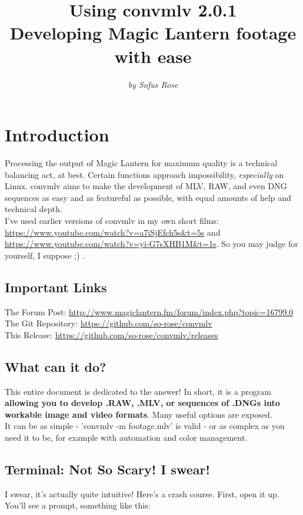 \documentclass[a4paper,12pt]{article}
\author{\textit{by Sofus Rose}}
\title{\textbf{Using convmlv 2.0.1} \\ {\large Developing Magic Lantern footage with ease}}
\begin{document}
\maketitle{}
\tableofcontents{}
\newpage

\section{Introduction}
	Processing the output of Magic Lantern for maximum quality is a technical balancing act, at best. Certain functions approach impossibility,
	\textit{especially} on Linux. convmlv aims to make the development of MLV, RAW, and even DNG sequences as easy and as featureful as
	possible, with equal amounts of help and technical depth.\\
	
	I've used earlier versions of convmlv in my own short films: \url{https://www.youtube.com/watch?v=a7iSjEfch5s&t=5s} and \url{https://www.youtube.com/watch?v=yi-G7sXHB1M&t=1s}.
	So you may judge for yourself, I suppose ;) .
	
	\subsection{Important Links}
		The Forum Post: \url{http://www.magiclantern.fm/forum/index.php?topic=16799.0}\\
		The Git Repository: \url{https://github.com/so-rose/convmlv}\\
		This Release: \url{https://github.com/so-rose/convmlv/releases}\\
	
	\subsection{What can it do?}
		This entire document is dedicated to the answer! In short, it is a program \textbf{allowing you to develop .RAW, .MLV, or sequences of .DNGs
		into workable image and video formats}. Many useful options are exposed.\\
		
		It can be as simple - 'convmlv -m footage.mlv' is valid - or as complex as you need it to be, for example with automation and color management.

	\subsection{Terminal: Not So Scary! I swear!}
		I swear, it's actually quite intuitive! Here's a crash course. First, open it up. You'll see a prompt, something like this:
		
\end{document}
